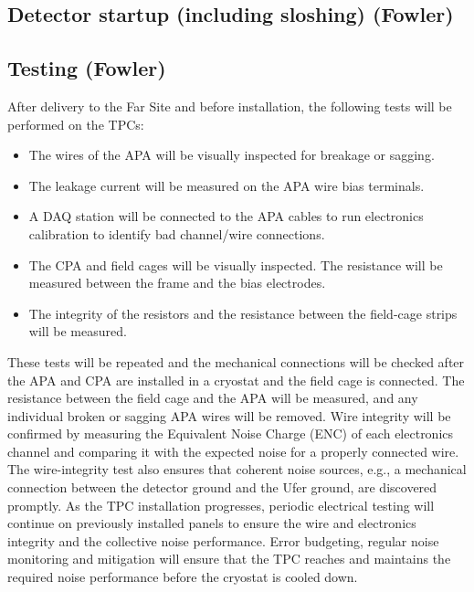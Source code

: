\subsection{Detector startup (including sloshing) (Fowler)}
\label{fd:install:startup}


\subsection{Testing (Fowler)}
\label{fd:install:testing}

After delivery to the Far Site and before installation, the following tests will be performed on the TPCs: 
\begin{itemize}
\item The wires of the APA will be visually inspected for breakage or sagging. 
\item The leakage current will be measured on the APA wire bias terminals. 
\item A DAQ station will be connected to the APA cables to run electronics calibration to identify bad channel/wire connections. 
\item The CPA and field cages will be visually inspected. The resistance will be measured between the frame and the bias electrodes. 
\item The integrity of the resistors and the resistance between the field-cage strips will be measured. 
\end{itemize}

These tests will be repeated and the mechanical connections will be checked after the APA and CPA are installed in a cryostat and the field cage is connected. The resistance between the field cage and the APA will be measured, 
and any individual broken or sagging APA wires will be removed. Wire integrity will be confirmed by measuring the Equivalent Noise Charge (ENC) of each electronics channel and comparing it with the expected noise for a 
properly connected wire. The wire-integrity test also ensures that coherent noise sources, e.g., a mechanical connection between the detector ground and the Ufer ground, are discovered promptly. As the TPC installation progresses, periodic electrical testing will continue on previously installed panels to ensure the wire 
and electronics integrity and the collective noise performance. Error budgeting, regular noise monitoring and mitigation will ensure that the TPC reaches and maintains the required noise performance before the cryostat is 
cooled down. 


